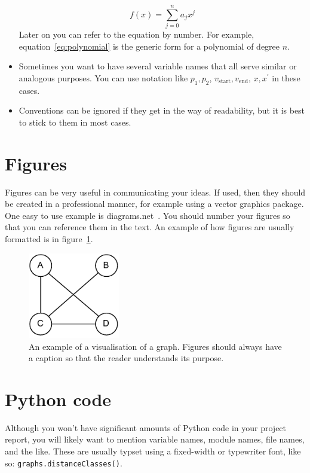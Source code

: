 \documentclass[a4paper]{article}
\begin{document}
\begin{itemize}
\begin{equation}
        f(x) = \sum_{j=0}^n a_j x^j
    \end{equation}
    Later on you can refer to the equation by number.  For example, equation~\eqref{eq:polynomial} is the generic form for a polynomial of degree $n$.
    \item Sometimes you want to have several variable names that all serve similar or analogous purposes.  You can use notation like $p_1, p_2$, $v_{\text{start}} , v_{\text{end}}$, $x, x^{\prime}$ in these cases.
    \item Conventions can be ignored if they get in the way of readability, but it is best to stick to them in most cases.
\end{itemize}

\section{Figures}
Figures can be very useful in communicating your ideas.  If used, then they should be created in a professional manner, for example using a vector graphics package.  One easy to use example is diagrams.net~\cite{diagramsnet}.  You should number your figures so that you can reference them in the text.  An example of how figures are usually formatted is in figure~\ref{fig:mygraph}.

\begin{figure}[ht]
    \begin{center}
        \includegraphics[width=4cm]{mygraph.pdf}
    \end{center}
    
    \caption{An example of a visualisation of a graph.  Figures should always have a caption so that the reader understands its purpose.}\label{fig:mygraph}
\end{figure}

\section{Python code}
Although you won't have significant amounts of Python code in your project report, you will likely want to mention variable names, module names, file names, and the like.  These are usually typset using a fixed-width or typewriter font, like so: \verb+graphs.distanceClasses()+.
\end{document}
